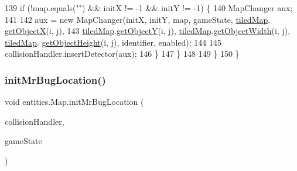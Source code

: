 \begin{DoxyCode}
139                 \textcolor{keywordflow}{if} (!map.equals(\textcolor{stringliteral}{""}) && initX != -1 && initY != -1) \{
140                     MapChanger aux;
141 
142                     aux = \textcolor{keyword}{new} MapChanger(initX, initY, map, gameState, \mbox{\hyperlink{classentities_1_1_map_a94a743ccd80946422fcbdb5ba1cc966b}{tiledMap}}.
      \mbox{\hyperlink{classorg_1_1newdawn_1_1slick_1_1tiled_1_1_tiled_map_a1f3254dc5845b361c2cbde74f587d4c1}{getObjectX}}(i, j),
143                             \mbox{\hyperlink{classentities_1_1_map_a94a743ccd80946422fcbdb5ba1cc966b}{tiledMap}}.\mbox{\hyperlink{classorg_1_1newdawn_1_1slick_1_1tiled_1_1_tiled_map_a690410873e8b1ddcf677545432fb44f7}{getObjectY}}(i, j), 
      \mbox{\hyperlink{classentities_1_1_map_a94a743ccd80946422fcbdb5ba1cc966b}{tiledMap}}.\mbox{\hyperlink{classorg_1_1newdawn_1_1slick_1_1tiled_1_1_tiled_map_afa4bb340b71651c7ac0b0a372f22ab60}{getObjectWidth}}(i, j), \mbox{\hyperlink{classentities_1_1_map_a94a743ccd80946422fcbdb5ba1cc966b}{tiledMap}}.
      \mbox{\hyperlink{classorg_1_1newdawn_1_1slick_1_1tiled_1_1_tiled_map_a2da39e5d72913b52ebb5a12397724f96}{getObjectHeight}}(i, j), identifier, enabled);
144 
145                     collisionHandler.insertDetector(aux);
146                 \}
147             \}
148 
149         \}
150     \}
\end{DoxyCode}
\mbox{\label{classentities_1_1_map_a8678aecbe6308ad69b2596d3452974cf}} 
\subsubsection{\texorpdfstring{init\+Mr\+Bug\+Location()}{initMrBugLocation()}}
{\footnotesize\ttfamily void entities.\+Map.\+init\+Mr\+Bug\+Location (\begin{DoxyParamCaption}\item[{\mbox{\hyperlink{classentities_1_1_collision_handler}{Collision\+Handler}}}]{collision\+Handler,  }\item[{\mbox{\hyperlink{classstates_1_1_game_state}{Game\+State}}}]{game\+State }\end{DoxyParamCaption})\hspace{0.3cm}{\ttfamily [inline]}}


